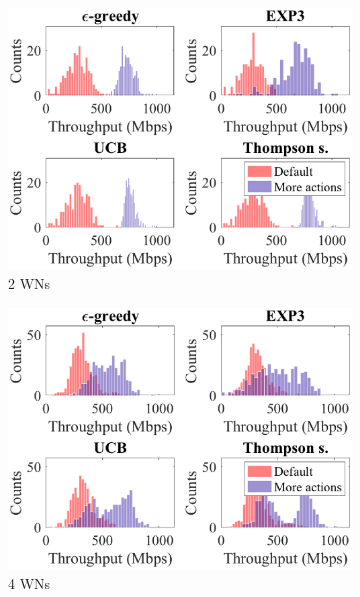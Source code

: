 \documentclass[preprint,12pt]{article}
\begin{document}
\begin{figure}[h!]
	\centering
	\begin{subfigure}[b]{.4\textwidth}
		\includegraphics[width=\textwidth]{images/hist_mean_tpt_2_WNs_actions}
		\caption{2 WNs}\label{fig:hist_mean_tpt_2_WNs_actions}
	\end{subfigure}
	\begin{subfigure}[b]{.4\textwidth}
		\includegraphics[width=\textwidth]{images/hist_mean_tpt_4_WNs_actions}
		\caption{4 WNs}\label{fig:hist_mean_tpt_4_WNs_actions}
	\end{subfigure}\\
	\begin{subfigure}[b]{.4\textwidth}

\end{subfigure}
\end{figure}
\end{document}
